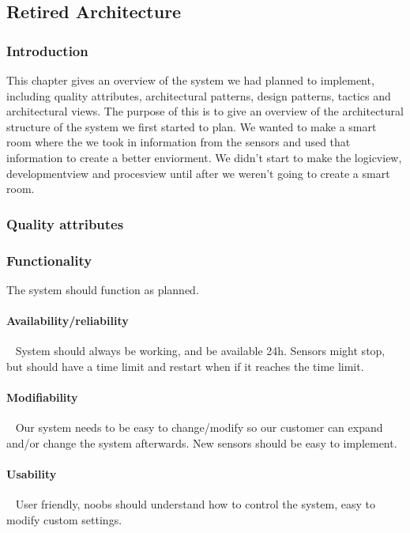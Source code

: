 \documentclass[../document]{subfiles}
\begin{document}
\subsection{Retired Architecture}
\label{retired_architecture}
\subsubsection{Introduction}
This chapter gives an overview of the system we had planned to implement, including quality attributes, architectural patterns, design patterns, tactics and architectural views. The purpose of this is to give an overview of the architectural structure of the system we first started to plan. We wanted to make a smart room where the we took in information from the sensors and used that information to create a better enviorment. We didn't start to make the logicview, developmentview and procesview until after we weren't going to create a smart room.

\subsubsection{Quality attributes}
\subsubsection{Functionality}
The system should function as planned. 

\paragraph{Availability/reliability} \ \newline
System should always be working, and be available 24h. Sensors might stop, but should have a time limit and restart when if it reaches the time limit. 

\paragraph{Modifiability} \ \newline
Our system needs to be easy to change/modify so our customer can expand and/or change the system afterwards. New sensors should be easy to implement.

\paragraph{Usability} \ \newline
User friendly, noobs should understand how to control the system, easy to modify custom settings.
\end{document}

